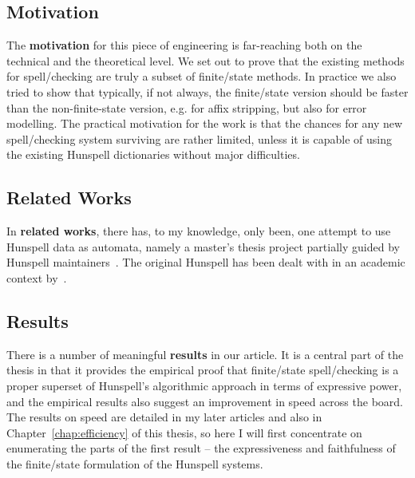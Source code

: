 \documentclass[officiallayout,final]{unihelcompling}
\begin{document}
\subsection{Motivation}

The \textbf{motivation} for this piece of engineering is far-reaching both on
the technical and the theoretical level. We set out to prove that the existing
methods for spell\-/checking are truly a subset of finite\-/state methods.  In
practice we also tried to show that typically, if not always, the
finite\-/state version should be faster than the non-finite-state version, e.g.
for affix stripping, but also for error modelling. The practical motivation for
the work is that the chances for any new spell\-/checking system surviving are
rather limited, unless it is capable of using the existing Hunspell
dictionaries without major difficulties.

\subsection{Related Works}

In \textbf{related works}, there has, to my knowledge, only been, one attempt
to use Hunspell data as automata, namely a master's thesis project partially
guided by Hunspell maintainers~\citep{greenfield2010open}.
The
original Hunspell has been dealt with in an academic context 
by~\citet{tron2005hunmorph}.

\subsection{Results}

There is a number of meaningful \textbf{results} in our article. It is a
central part of the thesis in that it provides the empirical proof that
finite\-/state spell\-/checking is a proper superset of Hunspell's algorithmic
approach in terms of expressive power, and the empirical results also suggest
an improvement in speed across the board. The results on speed are detailed in
my later articles and also in Chapter~\ref{chap:efficiency} of this thesis, so
here I will first concentrate on enumerating the parts of the first
result -- the expressiveness and faithfulness of the finite\-/state formulation
of the Hunspell systems.
\end{document}
